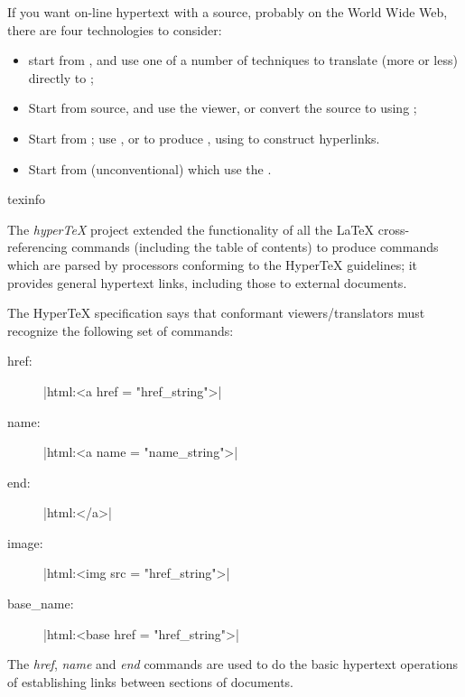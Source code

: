 If you want on-line hypertext with a \AllTeX{} source, probably on the
World Wide Web, there are four technologies to consider:
\begin{itemize}
\item start from \alltex{}, and use one of a number of techniques to
  translate (more or less) directly to
  ;
\item Start from  source,
  and use the  viewer, or convert the 
  source to  using ;
\item Start from \alltex{}; use \pdftex{}, \xetex{} or \LuaTeX{} to
  produce , using  to construct
  hyperlinks.
\item Start from (unconventional) \alltex{} which use the %
  .
\end{itemize}
\begin{ctanrefs}
\item[texinfo]
\end{ctanrefs}


The \emph{hyper\TeX{}} project extended the functionality of all the
\LaTeX{} cross-referencing commands (including the table of contents)
to produce  commands which are parsed by  processors
conforming to the Hyper\TeX{} guidelines;
it provides general hypertext links, including those
to external documents.

The Hyper\TeX{} specification says that conformant viewers/translators
must recognize the following set of  commands:
\begin{description}
\item[href:] |html:<a href = "href_string">|
\item[name:] |html:<a name = "name_string">|
\item[end:] |html:</a>|
\item[image:] |html:<img src = "href_string">|
\item[base\_name:] |html:<base href = "href_string">|
\end{description}

The \emph{href}, \emph{name} and \emph{end} commands are used to do
the basic hypertext operations of establishing links between sections
of documents. 

